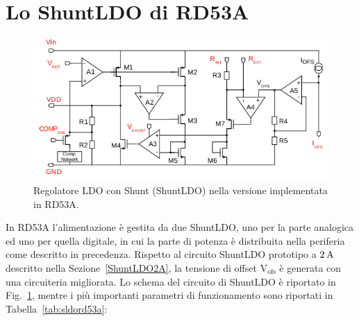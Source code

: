 \section{Lo ShuntLDO di RD53A}
\begin{figure}
\centering
\includegraphics[width=\textwidth]{Immagini/SLDO_RD53A}
\caption{Regolatore LDO con Shunt (ShuntLDO) nella versione implementata in RD53A.}
\label{SLDO_RD53A}
\end{figure}
In RD53A l'alimentazione è gestita da due ShuntLDO, uno per la parte analogica ed uno per quella digitale, in cui la parte di potenza \`e distribuita nella periferia come descritto in precedenza. Rispetto al circuito ShuntLDO prototipo a $2\rm \, A$ descritto nella Sezione~\ref{ShuntLDO2A}, la tensione di offset $\mathrm{V_{ofs}}$ è generata con una circuiteria migliorata. Lo schema del circuito di ShuntLDO è riportato in Fig.~\ref{SLDO_RD53A}, mentre i pi\`u importanti parametri di funzionamento sono riportati in Tabella~\ref{tab:sldord53a}:

